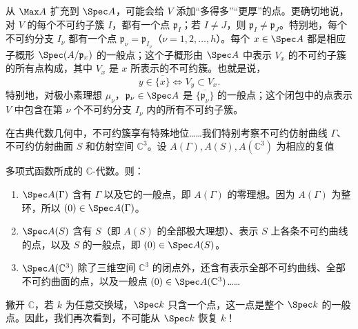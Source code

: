 从 $\Max A$ 扩充到 $\Spec A$，可能会给 $V$ 添加“多得多”“更厚”的点。更确切地说，对 $V$ 的每个不可约子簇 $I$，都有一个点 $\mathfrak p_I$；若 $I\ne J$，则 $\mathfrak p_I\ne\mathfrak p_J$。特别地，每个不可约分支 $I_\nu$ 都有一个点 $\mathfrak p_\nu=\mathfrak p_{I_\nu}$（$\nu=1,2,\ldots,h$）。每个 $x\in\Spec A$ 都是相应子概形 $\Spec(A/\mathfrak p_x)$ 的一般点；这个子概形由 $\Spec A$ 中表示 $V_x$ 的不可约子簇的所有点构成，其中 $V_x$ 是 $x$ 所表示的不可约簇。也就是说，
\[
y\in\overline{\{x\}}\iff V_y\subset V_x.
\]
特别地，对极小素理想 $\mu_\nu$，$\mathfrak p_\nu\in\Spec A$ 是 $\overline{\{\mathfrak p_\nu\}}$ 的一般点；这个闭包中的点表示 $V$ 中包含在第 $\nu$ 个不可约分支 $I_\nu$ 内的所有不可约子簇。

在古典代数几何中，不可约簇享有特殊地位……我们特别考察不可约仿射曲线 $\Gamma$、不可约仿射曲面 $S$ 和仿射空间 $\mathbb C^3$。设 $A(\Gamma),A(S),A(\mathbb C^3)$ 为相应的复值

多项式函数所成的 $\mathbb C$-代数。则：
\begin{enumerate}[label=\alph*)]
\item $\Spec A(\Gamma)$ 含有 $\Gamma$ 以及它的一般点，即 $A(\Gamma)$ 的零理想。因为 $A(\Gamma)$ 为整环，所以 $(0)\in\Spec A(\Gamma)$。
\item $\Spec A(S)$ 含有 $S$（即 $A(S)$ 的全部极大理想）、表示 $S$ 上各条不可约曲线的点，以及 $S$ 的一般点，即 $(0)\in\Spec A(S)$。
\item $\Spec A(\mathbb C^3)$ 除了三维空间 $\mathbb C^3$ 的闭点外，还含有表示全部不可约曲线、全部不可约曲面的点，以及一般点 $(0)\in\Spec A(\mathbb C^3)$……
\end{enumerate}
\begin{center}
\end{center}

撇开 $\mathbb C$，若 $k$ 为任意交换域，$\Spec k$ 只含一个点，这一点是整个 $\Spec k$ 的一般点。因此，我们再次看到，不可能从 $\Spec k$ 恢复 $k$！

